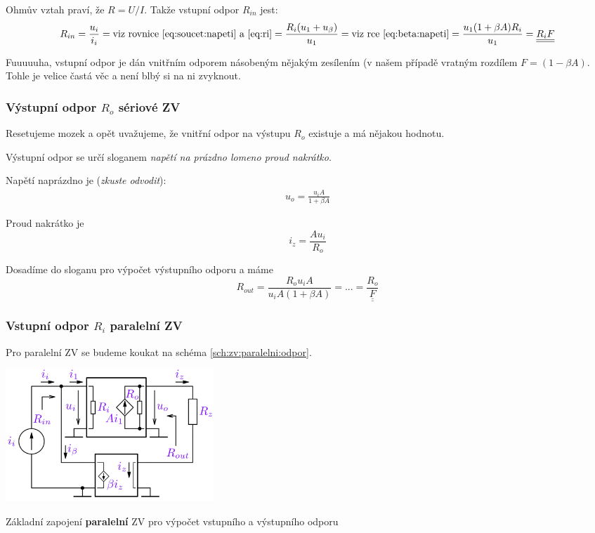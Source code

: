 \documentclass[a4paper,12pt]{article}   %
\begin{document}
Ohmův vztah praví, že $R=U/I$. Takže vstupní odpor $R_{in}$ jest:
\begin{equation}
    R_{in} = \frac{u_i}{i_i} = \text{viz rovnice \eqref{eq:soucet:napeti} a \eqref{eq:ri}} = \frac{R_i(u_\text{1}+u_\beta)}{u_1} = \text{viz rce \eqref{eq:beta:napeti}} = \frac{u_\text{1}(1+\beta A)R_i}{u_\text{1}} = \underline{\underline{R_i F}}
\end{equation}

Fuuuuuha, vstupní odpor je dán vnitřním odporem násobeným nějakým zesílením (v našem případě vratným rozdílem $F=(1-\beta A)$. Tohle je velice častá věc a není blbý si na ni zvyknout.


\subsubsection*{Výstupní odpor $R_o$ sériové ZV}

Resetujeme mozek a opět uvažujeme, že vnitřní odpor na výstupu $R_o$ existuje a má nějakou hodnotu.

Výstupní odpor se určí sloganem \textit{napětí na prázdno lomeno proud nakrátko}. 

Napětí naprázdno je (\textit{zkuste odvodit}):
\begin{align*}
    u_o = \frac{u_i A}{1+\beta A}
\end{align*}

Proud nakrátko je
\begin{equation*}
    i_z = \frac{A u_i}{R_o}
\end{equation*}

Dosadíme do sloganu pro výpočet výstupního odporu a máme
\begin{equation}
    R_{out} = \frac{R_o u_i A}{u_i A(1+\beta A)} =...= \underline{\underline{\frac{R_o}{F}}}
\end{equation}

\subsubsection*{Vstupní odpor $R_i$ paralelní ZV}
Pro paralelní ZV se budeme koukat na schéma \ref{sch:zv:paralelni:odpor}.
\begin{schema}[h!]
    \centering
    \includegraphics[height=5cm]{ZV_paralelni-odpory.PNG}
    \caption{Základní zapojení \textbf{paralelní} ZV pro výpočet vstupního a výstupního odporu}
    \label{sch:zv:paralelni:odpor}
\end{schema}
\end{document}
